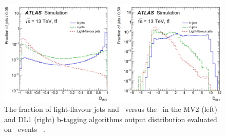 \begin{figure}[bth]
	\includegraphics[width=.9\textwidth]{FTAG_plots/b-tagging-score.png}
	\caption{The fraction of light-flavour jets and \cjets\ versus 
	the \bjets\ in the MV2 (left) and
	DL1 (right) b-tagging algorithms output distribution 
	evaluated on \ttbar\ events
	~\cite{FTAG-2018-01}.}\label{fig:b-tagging-score}
\end{figure}

